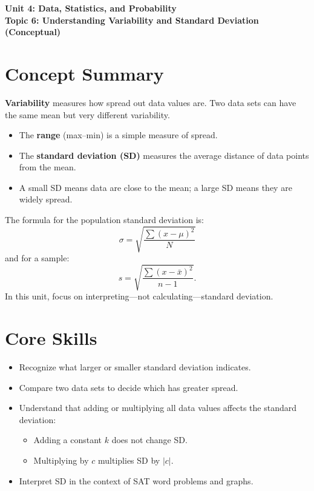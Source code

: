 \documentclass[14pt]{extarticle}
\begin{document}
\raggedright
{}

\begin{center}
    \LARGE \textbf{Unit 4: Data, Statistics, and Probability} \\[6pt]
    \Large \textbf{Topic 6: Understanding Variability and Standard Deviation (Conceptual)}
\end{center}

\vspace{1em}

\section*{Concept Summary}

\textbf{Variability} measures how spread out data values are. Two data sets can have the same mean but very different variability.

\begin{itemize}
  \item The \textbf{range} (max–min) is a simple measure of spread.
  \item The \textbf{standard deviation (SD)} measures the average distance of data points from the mean.
  \item A small SD means data are close to the mean; a large SD means they are widely spread.
\end{itemize}

The formula for the population standard deviation is:
\[
\sigma = \sqrt{\frac{\sum (x - \mu)^2}{N}}
\]
and for a sample:
\[
s = \sqrt{\frac{\sum (x - \bar{x})^2}{n-1}}.
\]
In this unit, focus on interpreting—not calculating—standard deviation.

\section*{Core Skills}
\begin{itemize}
  \item Recognize what larger or smaller standard deviation indicates.
  \item Compare two data sets to decide which has greater spread.
  \item Understand that adding or multiplying all data values affects the standard deviation:
  \begin{itemize}
    \item Adding a constant \(k\) does not change SD.
    \item Multiplying by \(c\) multiplies SD by \(|c|\).
  \end{itemize}
  \item Interpret SD in the context of SAT word problems and graphs.
\end{itemize}
\end{document}
